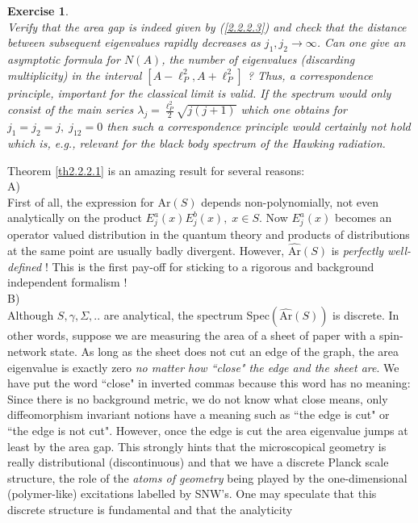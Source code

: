 \documentclass[12pt]{report}
\newtheorem{Exercise}{Exercise}[section]
\begin{document}
%
\begin{Exercise} \label{ex2.2.2.1} ~~~~~~~\\
Verify that the area gap is indeed given by (\ref{2.2.2.3}) and check that 
the distance between subsequent eigenvalues rapidly decreases as 
$j_1,j_2\to \infty$. Can one give an asymptotic formula for 
$N(A)$, the number of eigenvalues (discarding multiplicity) in the 
interval $[A-\ell_P^2,A+\ell_P^2]$ ? Thus, a 
correspondence principle, important for the classical limit is valid. 
If the spectrum would only consist of the {\it main series} 
$\lambda_j=\frac{\ell_P^2}{2}\sqrt{j(j+1)}$ which one obtains for 
$j_1=j_2=j,\;j_{12}=0$ then such a correspondence principle would 
certainly not hold which is, e.g., relevant for the black body 
spectrum of the Hawking radiation.
\end{Exercise}
%
Theorem \ref{th2.2.2.1} is an amazing result for several reasons:\\
A)\\
First of all, the expression for Ar$(S)$ depends non-polynomially, not 
even analytically on the product $E^a_j(x) E^b_j(x),\;x\in S$. Now 
$E^a_j(x)$ becomes an operator valued distribution in the quantum 
theory and products of distributions at the same point are usually
badly divergent. However, $\widehat{\mbox{Ar}}(S)$ is 
{\it perfectly well-defined} ! This is the first pay-off for sticking to 
a rigorous and background independent formalism !\\
B)\\
Although $S,\gamma,\Sigma,..$ are analytical, the spectrum 
Spec$(\widehat{\mbox{Ar}}(S))$ is discrete. In other words, suppose we 
are measuring the area of a sheet of paper with a spin-network state.
As long as the sheet does not cut an edge of the graph, the area 
eigenvalue is exactly zero {\it no matter how ``close" the edge and the 
sheet are}. We have put the word ``close" in inverted commas because 
this word has no meaning: Since there is no background metric, we do not 
know what close means, only diffeomorphism invariant notions have a meaning
such as ``the edge is cut" or ``the edge is not cut".
However, once the edge is cut the area eigenvalue jumps at least
by the area gap. This strongly hints that the microscopical 
geometry is really distributional (discontinuous) and that we have a 
discrete Planck scale structure, the role of the {\it atoms of geometry} 
being played by the one-dimensional (polymer-like) excitations labelled 
by SNW's. One may speculate that this discrete structure is  
fundamental and that the analyticity
\end{document}
